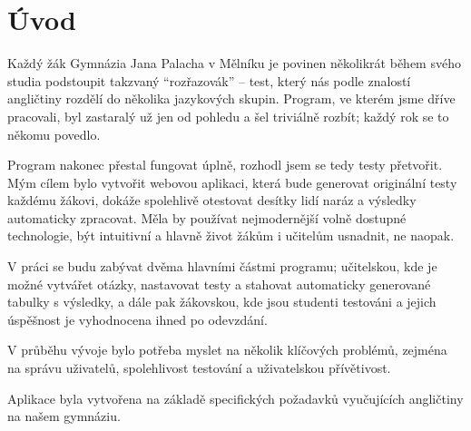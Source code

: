 \chapter*{Úvod}

Každý žák Gymnázia Jana Palacha v Mělníku je povinen několikrát během svého studia podstoupit takzvaný \enquote{rozřazovák} -- test, který nás podle znalostí angličtiny rozdělí do několika jazykových skupin. Program, ve kterém jsme dříve pracovali, byl zastaralý už jen od pohledu a šel triviálně rozbít; každý rok se to někomu povedlo.

Program nakonec přestal fungovat úplně, rozhodl jsem se tedy testy přetvořit. Mým cílem bylo vytvořit webovou aplikaci, která bude generovat originální testy každému žákovi, dokáže spolehlivě otestovat desítky lidí naráz a výsledky automaticky zpracovat. Měla by používat nejmodernější volně dostupné technologie, být intuitivní a hlavně život žákům i učitelům usnadnit, ne naopak.

V práci se budu zabývat dvěma hlavními částmi programu; učitelskou, kde je možné vytvářet otázky, nastavovat testy a stahovat automaticky generované tabulky s výsledky, a dále pak žákovskou, kde jsou studenti testováni a jejich úspěšnost je vyhodnocena ihned po odevzdání.

V průběhu vývoje bylo potřeba myslet na několik klíčových problémů, zejména na správu uživatelů, spolehlivost testování a uživatelskou přívětivost.

Aplikace byla vytvořena na základě specifických požadavků vyučujících angličtiny na našem gymnáziu.